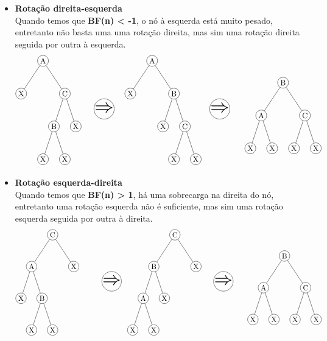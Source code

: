 \begin{itemize}
	\item \textbf{Rotação direita-esquerda} \\
		Quando temos que \textbf{BF(n) < -1}, o nó à esquerda está muito pesado, entretanto não basta uma uma rotação direita, mas sim uma rotação direita seguida por outra à esquerda.
	\begin{align*}
		\begin{tikzpicture}[
			every node/.style={circle, draw, minimum size=0.5cm, inner sep=0},
			level 1/.style={sibling distance=2cm},
			level 2/.style={sibling distance=1cm},
		]
		\node (tree1) at (0,0) {A}
			child {node {X}
			}
			child {node {C}
				child {node {B}
					child {node {X}}
					child {node {X}}
				}
				child {node {X}}
			};
			\node[style={}] (arrow) at (2.8,-2.2) {\Huge$\Rightarrow$};
		\node (tree2) at (5,0) {A}
			child {node {X}
			}
			child {node {B}
				child {node {X}
				}
				child {node {C}
					child {node {X}}
					child {node {X}}
				}
			};
			\node[style={}] (arrow) at (8.1,-2.2) {\Huge$\Rightarrow$};
		\node (tree3) at (11,-1) {B}
			child {node {A}
				child {node {X}}
				child {node {X}}
			}
			child {node {C}
				child {node {X}}
				child {node {X}}
			};
		\end{tikzpicture}
	\end{align*}
	\item \textbf{Rotação esquerda-direita} \\
		Quando temos que \textbf{BF(n) > 1}, há uma sobrecarga na direita do nó, entretanto uma rotação esquerda não é suficiente, mas sim uma rotação esquerda seguida por outra à direita.
	\begin{align*}
		\begin{tikzpicture}[
			every node/.style={circle, draw, minimum size=0.5cm, inner sep=0},
			level 1/.style={sibling distance=2cm},
			level 2/.style={sibling distance=1cm},
		]
		\node (tree1) at (0,0) {C}
			child {node {A}
				child {node {X}
				}
				child {node {B}
					child {node {X}}
					child {node {X}}
				}
			}
			child {node {X}
			};
			\node[style={}] (arrow) at (2.8,-2.2) {\Huge$\Rightarrow$};
		\node (tree2) at (5.8,0) {C}
			child {node {B}
				child {node {A}
					child {node {X}}
					child {node {X}}
				}
				child {node {X}
				}
			}
			child {node {X}
			};
			\node[style={}] (arrow) at (8.1,-2.2) {\Huge$\Rightarrow$};
		\node (tree3) at (11,-1) {B}
			child {node {A}
				child {node {X}}
				child {node {X}}
			}
			child {node {C}
				child {node {X}}
				child {node {X}}
			};
		\end{tikzpicture}
	\end{align*}
\end{itemize}

